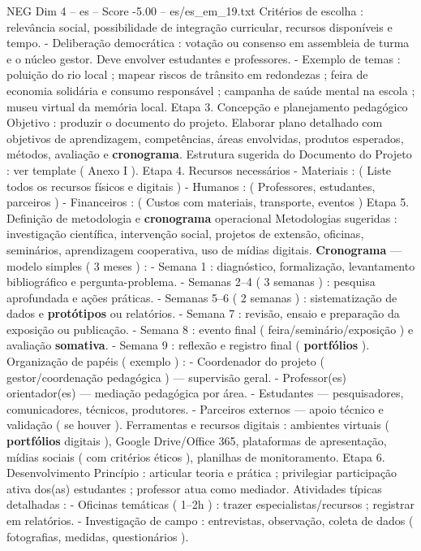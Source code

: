 \begin{textsample}{NEG Dim 4 – es – Score -5.00 – es/es\_em\_19.txt}
Critérios de escolha : relevância social, possibilidade de integração curricular, recursos disponíveis e tempo. - Deliberação democrática : votação ou consenso em assembleia de turma e o núcleo gestor.
Deve envolver estudantes e professores. - Exemplo de temas : poluição do rio local ; mapear riscos de trânsito em redondezas ; feira de economia solidária e consumo responsável ; campanha de saúde mental na escola ; museu virtual da memória local.
Etapa 3.
Concepção e planejamento pedagógico Objetivo : produzir o documento do projeto.
Elaborar plano detalhado com objetivos de aprendizagem, competências, áreas envolvidas, produtos esperados, métodos, avaliação e \textbf{cronograma}.
Estrutura sugerida do Documento do Projeto : ver template ( Anexo I ).
Etapa 4.
Recursos necessários - Materiais : ( Liste todos os recursos físicos e digitais ) - Humanos : ( Professores, estudantes, parceiros ) - Financeiros : ( Custos com materiais, transporte, eventos ) Etapa 5.
Definição de metodologia e \textbf{cronograma} operacional Metodologias sugeridas : investigação científica, intervenção social, projetos de extensão, oficinas, seminários, aprendizagem cooperativa, uso de mídias digitais. \textbf{Cronograma} — modelo simples ( 3 meses ) : - Semana 1 : diagnóstico, formalização, levantamento bibliográfico e pergunta-problema. - Semanas 2–4 ( 3 semanas ) : pesquisa aprofundada e ações práticas. - Semanas 5–6 ( 2 semanas ) : sistematização de dados e \textbf{protótipos} ou relatórios. - Semana 7 : revisão, ensaio e preparação da exposição ou publicação. - Semana 8 : evento final ( feira/seminário/exposição ) e avaliação \textbf{somativa}. - Semana 9 : reflexão e registro final ( \textbf{portfólios} ).
Organização de papéis ( exemplo ) : - Coordenador do projeto ( gestor/coordenação pedagógica ) — supervisão geral. - Professor(es) orientador(es) — mediação pedagógica por área. - Estudantes — pesquisadores, comunicadores, técnicos, produtores. - Parceiros externos — apoio técnico e validação ( se houver ).
Ferramentas e recursos digitais : ambientes virtuais ( \textbf{portfólios} digitais ), Google Drive/Office 365, plataformas de apresentação, mídias sociais ( com critérios éticos ), planilhas de monitoramento.
Etapa 6.
Desenvolvimento Princípio : articular teoria e prática ; privilegiar participação ativa dos(as) estudantes ; professor atua como mediador.
Atividades típicas detalhadas : - Oficinas temáticas ( 1–2h ) : trazer especialistas/recursos ; registrar em relatórios. - Investigação de campo : entrevistas, observação, coleta de dados ( fotografias, medidas, questionários ).

\end{textsample}

